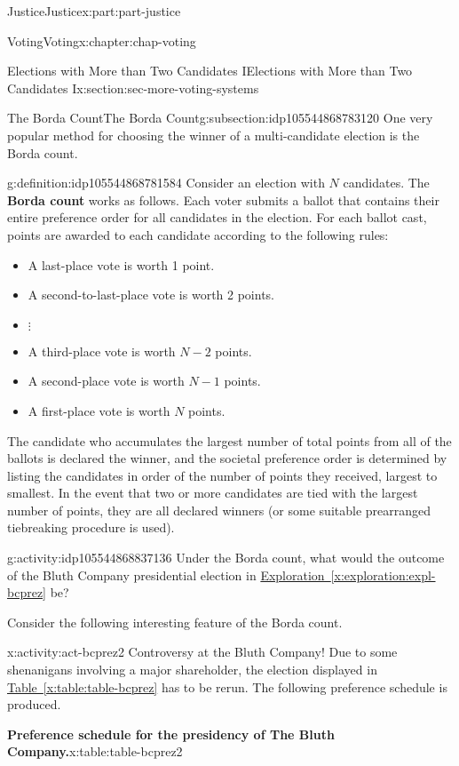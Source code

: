 \documentclass[oneside,10pt,]{book}
\newcommand{\xreffont}{\relax}
\newcommand{\terminology}[1]{\textbf{#1}}
\numberwithin{equation}{section}
\begin{document}
\begin{partptx}{Justice}{}{Justice}{}{}{x:part:part-justice}
\begin{chapterptx}{Voting}{}{Voting}{}{}{x:chapter:chap-voting}
\begin{sectionptx}{Elections with More than Two Candidates I}{}{Elections with More than Two Candidates I}{}{}{x:section:sec-more-voting-systems}
\begin{subsectionptx}{The Borda Count}{}{The Borda Count}{}{}{g:subsection:idp105544868783120}
One very popular method for choosing the winner of a multi-candidate election is the Borda count.%
\begin{definition}{}{g:definition:idp105544868781584}%
%
%
Consider an election with \(N\) candidates. The \terminology{Borda count} works as follows. Each voter submits a ballot that contains their entire preference order for all candidates in the election. For each ballot cast, points are awarded to each candidate according to the following rules:%
%
\begin{itemize}[label=\textbullet]
\item{}A last-place vote is worth 1 point.%
\item{}A second-to-last-place vote is worth 2 points.%
\item{}\(\displaystyle \vdots\)%
\item{}A third-place vote is worth \(N-2\) points.%
\item{}A second-place vote is worth \(N-1\) points.%
\item{}A first-place vote is worth \(N\) points.%
\end{itemize}
The candidate who accumulates the largest number of total points from all of the ballots is declared the winner, and the societal preference order is determined by listing the candidates in order of the number of points they received, largest to smallest. In the event that two or more candidates are tied with the largest number of points, they are all declared winners (or some suitable prearranged tiebreaking procedure is used).%
\end{definition}
\begin{activity}{}{g:activity:idp105544868837136}%
Under the Borda count, what would the outcome of the Bluth Company presidential election in \hyperref[x:exploration:expl-bcprez]{Exploration~{\xreffont\ref{x:exploration:expl-bcprez}}} be?%
\end{activity}%
Consider the following interesting feature of the Borda count.%
\begin{activity}{}{x:activity:act-bcprez2}%
Controversy at the Bluth Company! Due to some shenanigans involving a major shareholder, the election displayed in \hyperref[x:table:table-bcprez]{Table~{\xreffont\ref{x:table:table-bcprez}}} has to be rerun. The following preference schedule is produced.%
\begin{tableptx}{\textbf{Preference schedule for the presidency of The Bluth Company.}}{x:table:table-bcprez2}{}%
\centering%

\end{tableptx}
\end{activity}
\end{subsectionptx}
\end{sectionptx}
\end{chapterptx}
\end{partptx}
\end{document}
